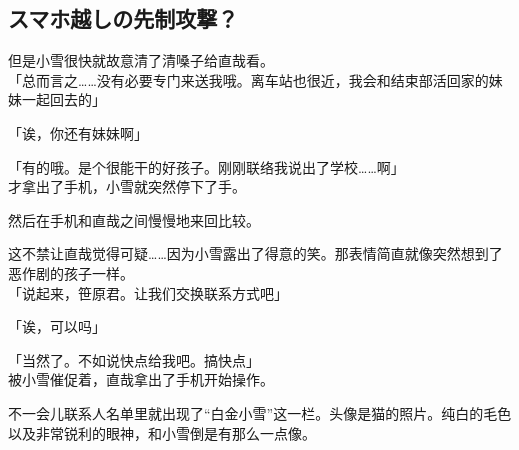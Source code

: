 \subsection{スマホ越しの先制攻撃？}

但是小雪很快就故意清了清嗓子给直哉看。\\

「总而言之……没有必要专门来送我哦。离车站也很近，我会和结束部活回家的妹妹一起回去的」

「诶，你还有妹妹啊」

「有的哦。是个很能干的好孩子。刚刚联络我说出了学校……啊」\\

才拿出了手机，小雪就突然停下了手。

然后在手机和直哉之间慢慢地来回比较。

这不禁让直哉觉得可疑……因为小雪露出了得意的笑。那表情简直就像突然想到了恶作剧的孩子一样。\\

「说起来，笹原君。让我们交换联系方式吧」

「诶，可以吗」

「当然了。不如说快点给我吧。搞快点」\\

被小雪催促着，直哉拿出了手机开始操作。

不一会儿联系人名单里就出现了“白金小雪”这一栏。头像是猫的照片。纯白的毛色以及非常锐利的眼神，和小雪倒是有那么一点像。\\

